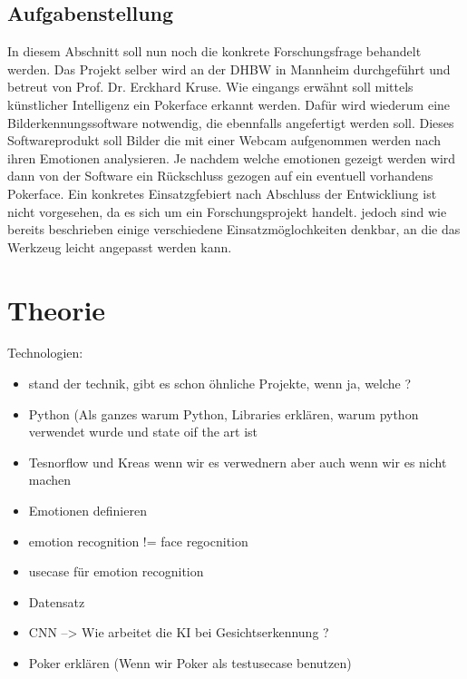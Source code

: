 \documentclass[12pt, a4paper]{scrbook}
\begin{document}
\section{Aufgabenstellung}
In diesem Abschnitt soll nun noch die konkrete Forschungsfrage behandelt werden. Das Projekt selber wird an der DHBW in Mannheim durchgeführt und betreut von Prof. Dr. Erckhard Kruse.
\newline
 Wie eingangs erwähnt soll mittels künstlicher Intelligenz ein Pokerface erkannt werden. Dafür wird wiederum eine Bilderkennungssoftware notwendig, die ebennfalls angefertigt werden soll. Dieses Softwareprodukt soll Bilder%
die mit einer Webcam aufgenommen werden nach ihren Emotionen analysieren. Je nachdem welche emotionen gezeigt werden wird dann von der Software ein Rückschluss gezogen auf ein eventuell vorhandens Pokerface. Ein konkretes Einsatzgfebiert nach Abschluss der Entwickliung ist nicht vorgesehen, da es sich um ein Forschungsprojekt handelt. jedoch sind wie bereits beschrieben einige verschiedene Einsatzmöglochkeiten denkbar, an die das Werkzeug leicht angepasst werden kann. 



\let\cleardoublepage\relax
\chapter{Theorie}
Technologien:
\begin{itemize}
\item stand der technik, gibt es schon öhnliche Projekte, wenn ja, welche ? 
\item Python (Als ganzes warum Python, Libraries erklären, warum python verwendet wurde und state oif the art ist
\item Tesnorflow und Kreas wenn wir es verwednern aber auch wenn wir es nicht machen
\item Emotionen definieren 
\item emotion recognition !=  face regocnition 
\item usecase für emotion recognition
\item Datensatz
\item CNN --> Wie arbeitet die KI bei Gesichtserkennung ?
\item Poker erklären (Wenn wir Poker als testusecase benutzen)
\end{itemize}
\end{document}
